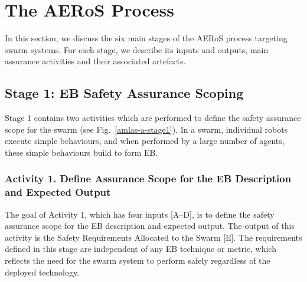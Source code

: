\documentclass[runningheads]{llncs}
\begin{document}
\section{The AERoS Process}\label{framework}
In this section, we discuss the six main stages of the AERoS process targeting swarm systems. For each stage, we describe its inputs and outputs, main assurance activities and their associated artefacts.
%

\subsection{Stage 1: EB Safety Assurance Scoping} \label{framework-stage1}
Stage 1 contains two activities which are performed to define the safety assurance scope for the swarm (see Fig.~\ref{amlas-a-stage1}). In a swarm, individual robots execute simple behaviours, and when performed by a large number of agents, these simple behaviours build to form EB.
\subsubsection*{Activity 1. Define Assurance Scope for the EB Description and Expected Output}
The goal of Activity 1, which has four inputs [A--D], is to define the safety assurance scope for the EB description and expected output. 
The output of this activity is the Safety Requirements Allocated to the Swarm [E]. The requirements defined in this stage are independent of any EB technique or metric, which reflects the need for the swarm system to perform safely regardless of the deployed technology. 
\end{document}
